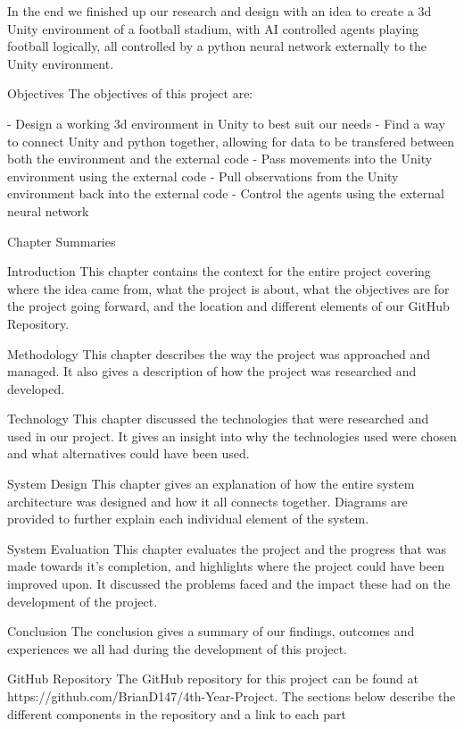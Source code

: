 In the end we finished up our research and design with an idea to create a 3d Unity environment of a football stadium, with AI controlled agents playing football logically, all controlled by a python neural network externally to the Unity environment.

Objectives
The objectives of this project are:

- Design a working 3d environment in Unity to best suit our needs
- Find a way to connect Unity and python together, allowing for data to be transfered between both the environment and the external code
- Pass movements into the Unity environment using the external code
- Pull observations from the Unity environment back into the external code
- Control the agents using the external neural network

Chapter Summaries

Introduction
This chapter contains the context for the entire project covering where the idea came from, what the project is about, what the objectives are for the project going forward, and the location and different elements of our GitHub Repository.

Methodology
This chapter describes the way the project was approached and managed. It also gives a description of how the project was researched and developed.

Technology
This chapter discussed the technologies that were researched and used in our project. It gives an insight into why the technologies used were chosen and what alternatives could have been used.

System Design
This chapter gives an explanation of how the entire system architecture was designed and how it all connects together. Diagrams are provided to further explain each individual element of the system.

System Evaluation
This chapter evaluates the project and the progress that was made towards it's completion, and highlights where the project could have been improved upon. It discussed the problems faced and the impact these had on the development of the project.

Conclusion
The conclusion gives a summary of our findings, outcomes and experiences we all had during the development of this project.

GitHub Repository
The GitHub repository for this project can be found at 
https://github.com/BrianD147/4th-Year-Project.
The sections below describe the different components in the repository and a link to each part


